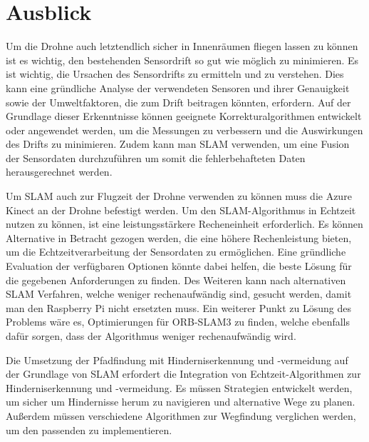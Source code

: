 \section{Ausblick}
Um die Drohne auch letztendlich sicher in Innenräumen fliegen lassen zu können ist es wichtig, den bestehenden Sensordrift so gut wie möglich zu minimieren. Es ist wichtig, die Ursachen des Sensordrifts zu ermitteln und zu verstehen. Dies kann eine gründliche Analyse der verwendeten Sensoren und ihrer Genauigkeit sowie der Umweltfaktoren, die zum Drift beitragen könnten, erfordern. Auf der Grundlage dieser Erkenntnisse können geeignete Korrekturalgorithmen entwickelt oder angewendet werden, um die Messungen zu verbessern und die Auswirkungen des Drifts zu minimieren. Zudem kann man SLAM verwenden, um eine Fusion der Sensordaten durchzuführen um somit die fehlerbehafteten Daten herausgerechnet werden. 

Um SLAM auch zur Flugzeit der Drohne verwenden zu können muss die Azure Kinect an der Drohne befestigt werden.
Um den SLAM-Algorithmus in Echtzeit nutzen zu können, ist eine leistungsstärkere Recheneinheit erforderlich. Es können Alternative in Betracht gezogen werden, die eine höhere Rechenleistung bieten, um die Echtzeitverarbeitung der Sensordaten zu ermöglichen. Eine gründliche Evaluation der verfügbaren Optionen könnte dabei helfen, die beste Lösung für die gegebenen Anforderungen zu finden. Des Weiteren kann nach alternativen SLAM Verfahren, welche weniger rechenaufwändig sind, gesucht werden, damit man den Raspberry Pi nicht ersetzten muss. Ein weiterer Punkt zu Lösung des Problems wäre es, Optimierungen für ORB-SLAM3 zu finden, welche ebenfalls dafür sorgen, dass der Algorithmus weniger rechenaufwändig wird. 

Die Umsetzung der Pfadfindung mit Hinderniserkennung und -vermeidung auf der Grundlage von SLAM erfordert die Integration von Echtzeit-Algorithmen zur Hinderniserkennung und -vermeidung. Es müssen Strategien entwickelt werden, um sicher um Hindernisse herum zu navigieren und alternative Wege zu planen. Außerdem müssen verschiedene Algorithmen zur Wegfindung verglichen werden, um den passenden zu implementieren.